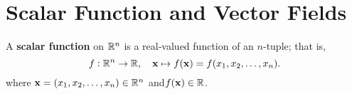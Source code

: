\documentclass[11pt,openany]{article}
\renewcommand{\vec}[1]{\mathbf{#1}}
\begin{document}
\section*{Scalar Function and Vector Fields}
A \textbf{scalar function} on \(\mathbb{R}^n\) is a real‑valued function of an \(n\)-tuple; that is,
\[
f:\R^n\to\R,\quad\vec{x}\mapsto f(\vec{x})=f(x_1,x_2,\dots,x_n).
\] where \(\vec{x}=(x_1,x_2,\dots,x_n)\in\R^n\) and\(f(\vec{x})\in\R\).
%
%
%
%
%
%
%
%
%
%
%	
%	
%	
\end{document}
